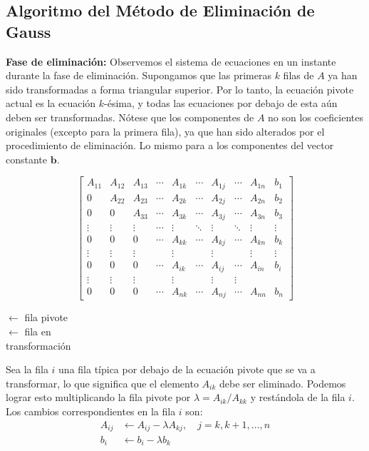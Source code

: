 \documentclass[12pt,letterpaper]{article}
\theoremstyle{definition}
\theoremstyle{plain}
\theoremstyle{remark}
\begin{document}
\subsection*{Algoritmo del Método de Eliminación de Gauss}

\textbf{Fase de eliminación:} Observemos el sistema de ecuaciones en un instante durante la fase de eliminación. Supongamos que las primeras $k$ filas de $A$ ya han sido transformadas a forma triangular superior. Por lo tanto, la ecuación pivote actual es la ecuación $k$-ésima, y todas las ecuaciones por debajo de esta aún deben ser transformadas. Nótese que los componentes de $A$ no son los coeficientes originales (excepto para la primera fila), ya que han sido alterados por el procedimiento de eliminación. Lo mismo para a los componentes del vector constante $\mathbf{b}$.

\[
\left[
\begin{array}{ccccccccc|c}
A_{11} & A_{12} & A_{13} & \cdots & A_{1k} & \cdots & A_{1j} & \cdots & A_{1n} & b_1 \\
0 & A_{22} & A_{23} & \cdots & A_{2k} & \cdots & A_{2j} & \cdots & A_{2n} & b_2 \\
0 & 0 & A_{33} & \cdots & A_{3k} & \cdots & A_{3j} & \cdots & A_{3n} & b_3 \\
\vdots & \vdots & \vdots & \cdots & \vdots & \ddots & \vdots & \ddots & \vdots & \vdots \\
0 & 0 & 0 & \cdots & A_{kk} & \cdots & A_{kj} & \cdots & A_{kn} & b_k \\ \hline
\vdots & \vdots & \vdots & & \vdots & & \vdots & & \vdots & \vdots \\
0 & 0 & 0 & \cdots & A_{ik} & \cdots & A_{ij}  & \cdots & A_{in} & b_i \\
\vdots & \vdots & \vdots & & \vdots & & \vdots & \vdots \\
0 & 0 & 0 & \cdots & A_{nk} & \cdots & A_{nj} & \cdots & A_{nn} & b_n
\end{array}
\right]
\]
\vspace{-3.5cm}
\begin{flushright}
$\leftarrow$ fila pivote \\
\vspace{.6cm}
$\leftarrow$ fila en\\ transformación
\end{flushright}
\vspace{1cm}

Sea la fila $i$ una fila típica por debajo de la ecuación pivote que se va a transformar, lo que significa que el elemento $A_{ik}$ debe ser eliminado. Podemos lograr esto multiplicando la fila pivote por $\lambda = A_{ik}/A_{kk}$ y restándola de la fila $i$. Los cambios correspondientes en la fila $i$ son:
\begin{align}
A_{ij} &\leftarrow A_{ij} - \lambda A_{kj}, \quad j = k, k+1, \ldots, n \label{eq:1.5a} \tag{1.5a} \\
b_i &\leftarrow b_i - \lambda b_k \label{eq:1.5b} \tag{1.5b}
\end{align}
\end{document}
